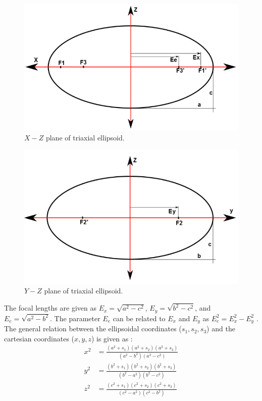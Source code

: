 \begin{figure}[h]
\centering
\captionsetup{justification=centering}
\includegraphics[scale=0.5]{ellipse_1_final.png}
\caption{$X-Z$ plane of triaxial ellipsoid.}
\label{xzplane}
\end{figure}
%
\begin{figure}[h]
\centering
\captionsetup{justification=centering}
\includegraphics[scale=0.5]{ellipse_2_final.png}
\caption{$Y-Z$ plane of triaxial ellipsoid.}
\label{yzplane}
\end{figure}
%
The focal lengths are given as $E_x = \sqrt{a^2 - c^2}$, $E_y = \sqrt{b^2 - c^2}$, and $E_e = \sqrt{a^2 - b^2}$. The parameter $E_e$ can be related to $E_x$ and $E_y$ as $E_e^2 = E_x^2 - E_y^2$ \cite{elliptic_integral}. The general relation between the ellipsoidal coordinates ($s_1, s_2, s_3$) and the cartesian coordinates ($x,y,z$) is given as \cite{elliptic_integral}:
\begin{align}
\label{xsrel}
x^2 &= \frac{(a^2 + s_1)(a^2 + s_2)(a^2+s_3)}{(a^2-b^2)(a^2-c^2)}\\
\label{ysrel}
y^2 &= \frac{(b^2 + s_1)(b^2 + s_2)(b^2+s_3)}{(b^2-a^2)(b^2-c^2)}\\
\label{zsrel}
z^2 &= \frac{(c^2 + s_1)(c^2 + s_2)(c^2+s_3)}{(c^2-a^2)(c^2-b^2)}
\end{align}
